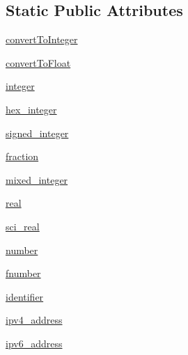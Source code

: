 \subsection*{Static Public Attributes}
\begin{DoxyCompactItemize}
\item 
\hyperlink{classpkg__resources_1_1__vendor_1_1pyparsing_1_1pyparsing__common_a80507d659f442dfdf70bb7a6ca9367cc}{convert\+To\+Integer}
\item 
\hyperlink{classpkg__resources_1_1__vendor_1_1pyparsing_1_1pyparsing__common_ad378a8815eb2191c7c8f481db0fb941f}{convert\+To\+Float}
\item 
\hyperlink{classpkg__resources_1_1__vendor_1_1pyparsing_1_1pyparsing__common_ae130be28250aa3e676d778625aefa220}{integer}
\item 
\hyperlink{classpkg__resources_1_1__vendor_1_1pyparsing_1_1pyparsing__common_a4b268e724d45ac50d841dde6d263a27d}{hex\+\_\+integer}
\item 
\hyperlink{classpkg__resources_1_1__vendor_1_1pyparsing_1_1pyparsing__common_a3894306858ef8b216899a8ca5d2a1714}{signed\+\_\+integer}
\item 
\hyperlink{classpkg__resources_1_1__vendor_1_1pyparsing_1_1pyparsing__common_a2bd4cca851d7f5a00d7d3b3fcba76ba1}{fraction}
\item 
\hyperlink{classpkg__resources_1_1__vendor_1_1pyparsing_1_1pyparsing__common_a73f9c00c49a5e2f230f536e59d4c9075}{mixed\+\_\+integer}
\item 
\hyperlink{classpkg__resources_1_1__vendor_1_1pyparsing_1_1pyparsing__common_afa401259f725e43fb435523cfae3f730}{real}
\item 
\hyperlink{classpkg__resources_1_1__vendor_1_1pyparsing_1_1pyparsing__common_a9b7b8c18d8e7b9e9234eb80820eb3b2e}{sci\+\_\+real}
\item 
\hyperlink{classpkg__resources_1_1__vendor_1_1pyparsing_1_1pyparsing__common_a4705753299624905296ab802797793dd}{number}
\item 
\hyperlink{classpkg__resources_1_1__vendor_1_1pyparsing_1_1pyparsing__common_ac7edbbb0e03add8258af59a7b5a62cd8}{fnumber}
\item 
\hyperlink{classpkg__resources_1_1__vendor_1_1pyparsing_1_1pyparsing__common_a40ee4a1b092b5def784b6a86891c65a5}{identifier}
\item 
\hyperlink{classpkg__resources_1_1__vendor_1_1pyparsing_1_1pyparsing__common_a1264fe6d0373cc26b8ac2230299d3662}{ipv4\+\_\+address}
\item 
\hyperlink{classpkg__resources_1_1__vendor_1_1pyparsing_1_1pyparsing__common_a248cca6b4662cd60efc6f533d8f17d49}{ipv6\+\_\+address}

\end{DoxyCompactItemize}
